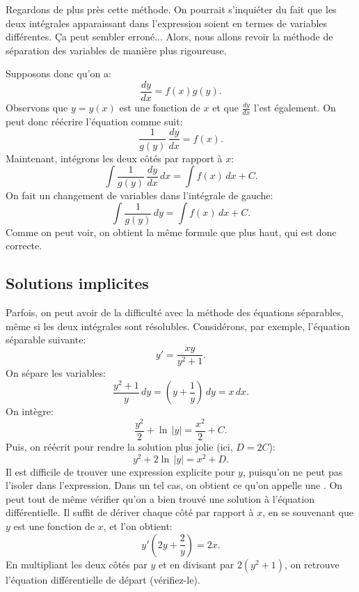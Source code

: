Regardons de plus près cette méthode.  On pourrait s'inquiéter du fait que les deux intégrales apparaissant dans l'expression soient en termes de variables différentes.  Ça peut sembler erroné... Alors, nous allons revoir la méthode de séparation des variables de manière plus rigoureuse.

Supposons donc qu'on a:
\begin{equation*}
	\frac{dy}{dx} = f(x)g(y) .
\end{equation*}
Observons que $y = y(x)$ est une fonction de $x$ et que
$\frac{dy}{dx}$ l'est également.  On peut donc réécrire l'équation comme suit:
\begin{equation*}
	\frac{1}{g(y)}\,\frac{dy}{dx} = f(x) .
\end{equation*}
Maintenant, intégrons les deux côtés par rapport à $x$:
\begin{equation*}
	\int \frac{1}{g(y)}\,\frac{dy}{dx} \,dx = \int f(x) \,dx + C .
\end{equation*}
On fait un changement de variables dans l'intégrale de gauche:
\begin{equation*}
	\int \frac{1}{g(y)}\,dy = \int f(x) \,dx + C .
\end{equation*}
Comme on peut voir, on obtient la même formule que plus haut, qui est donc correcte.




\subsection{Solutions implicites}

Parfois, on peut avoir de la difficulté avec la méthode des équations séparables,
même si les deux intégrales sont résolubles.
Considérons, par exemple, l'équation séparable suivante:
\begin{equation*}
	y' = \frac{xy}{y^2+1} .
\end{equation*}
On sépare les variables:
\begin{equation*}
	\frac{y^2+1}{y}\,dy = \left(y+\frac{1}{y}\right)\,dy = x\,dx .
\end{equation*}
On intègre:
\begin{equation*}
	\frac{y^2}{2} + \ln \, \lvert y \rvert = \frac{x^2}{2} + C.
\end{equation*}
Puis, on réécrit pour rendre la solution plus jolie (ici, $D = 2C$):
\begin{equation*}
	y^2 + 2 \ln \, \lvert y\rvert = x^2 + D .
\end{equation*}
Il est difficile de trouver une expression explicite pour $y$, puisqu'on ne peut pas l'isoler dans l'expression.
Dans un tel cas, on obtient ce qu'on appelle une
\emph{}.
On peut tout de même vérifier qu'on a bien trouvé une solution à l'équation différentielle.
Il suffit de dériver chaque côté par rapport à $x$, en se souvenant que $y$ est une fonction de $x$, et l'on obtient:
\begin{equation*}
	y'\left(2y + \frac{2}{y}\right) = 2x .
\end{equation*}
En multipliant les deux côtés par $y$ et en divisant par $2(y^2+1)$, on retrouve l'équation différentielle de départ (vérifiez-le).

